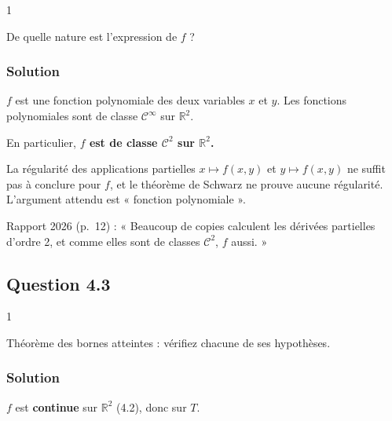 \documentclass[11pt,a4paper]{article}
\begin{document}
\begin{indication}{1}

De quelle nature est l'expression de \(f\) ?

\end{indication}

\hypertarget{solution-34}{%
\subsubsection{Solution}\label{solution-34}}

\(f\) est une fonction polynomiale des deux variables \(x\) et \(y\). Les fonctions polynomiales sont de classe \(\mathcal C^\infty\) sur \(\mathbb R^2\).

En particulier, \textbf{\(f\) est de classe \(\mathcal C^2\) sur \(\mathbb R^2\).}

\begin{piege}

La régularité des applications partielles \(x\mapsto f(x,y)\) et \(y\mapsto f(x,y)\) ne suffit pas à conclure pour \(f\), et le théorème de Schwarz ne prouve aucune régularité. L'argument attendu est « fonction polynomiale ».

\end{piege}

\begin{jury}

Rapport 2026 (p.~12) : « Beaucoup de copies calculent les dérivées partielles d'ordre 2, et comme elles sont de classes \(\mathcal C^2\), \(f\) aussi. »

\end{jury}

\hypertarget{question-4.3}{%
\subsection{Question 4.3}\label{question-4.3}}

\begin{indication}{1}

Théorème des bornes atteintes : vérifiez chacune de ses hypothèses.

\end{indication}

\hypertarget{solution-35}{%
\subsubsection{Solution}\label{solution-35}}

\(f\) est \textbf{continue} sur \(\mathbb R^2\) (4.2), donc sur \(T\).
\end{document}
